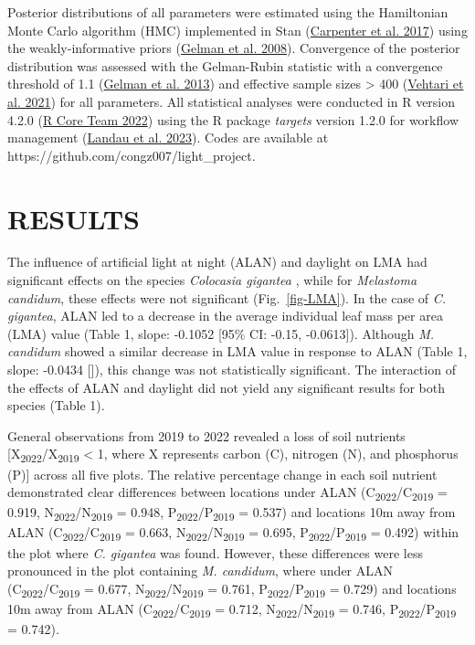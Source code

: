 \documentclass[
  12pt,
  letterpaper,
  DIV=11,
  numbers=noendperiod]{scrartcl}
\providecommand{\DIFaddtex}[1]{{\protect\color{blue}\uwave{#1}}} %
\providecommand{\DIFaddbegin}{} %
\providecommand{\DIFaddend}{} %
\providecommand{\DIFadd}[1]{\texorpdfstring{\DIFaddtex{#1}}{#1}} %
\newcommand{\DIFaddincludegraphics}[2][]{{\color{blue}\fbox{\DIFOincludegraphics[#1]{#2}}}} %
\DeclareRobustCommand{\DIFaddbegin}{\DIFOaddbegin \let\includegraphics\DIFaddincludegraphics} %
\DeclareRobustCommand{\DIFaddend}{\DIFOaddend \let\includegraphics\DIFOincludegraphics} %
\begin{document}
Posterior distributions of all parameters were estimated using the
Hamiltonian Monte Carlo algorithm (HMC) implemented in Stan
(\protect\hyperlink{ref-Carpenter2017}{Carpenter et al. 2017}) using the
weakly-informative priors (\protect\hyperlink{ref-Gelman2008}{Gelman et
al. 2008}). Convergence of the posterior distribution was assessed with
the Gelman-Rubin statistic with a convergence threshold of 1.1
(\protect\hyperlink{ref-Gelman2013}{Gelman et al. 2013}) and effective
sample sizes \textgreater{} 400
(\protect\hyperlink{ref-Vehtari2021}{Vehtari et al. 2021}) for all
parameters. All statistical analyses were conducted in R version 4.2.0
(\protect\hyperlink{ref-RCoreTeam2022}{R Core Team 2022}) using the R
package \emph{targets} version 1.2.0 for workflow management
(\protect\hyperlink{ref-Landau2023}{Landau et al. 2023}). Codes are
available at https://github.com/congz007/light\_project.

\hypertarget{results}{%
\section{RESULTS}\label{results}}

The influence of artificial light at night (ALAN) and daylight on LMA
had significant effects on the species \emph{Colocasia gigantea }, while
for \emph{Melastoma candidum}, these effects were not significant
(Fig.~\ref{fig-LMA}). In the case of \emph{C. gigantea}, ALAN led to a
decrease in the average individual leaf mass per area (LMA) value (Table
1, slope: -0.1052 {[}95\% CI: -0.15, -0.0613{]}). Although \emph{M.
candidum} showed a similar decrease in LMA value in response to ALAN
(Table 1, slope: -0.0434 \DIFaddbegin {[}\DIFadd{95\% CI: -0.1147, 0.0278}{]}\DIFaddend ), this change
was not statistically significant. The interaction of the effects of
ALAN and daylight did not yield any significant results for both species
(Table 1).

General observations from 2019 to 2022 revealed a loss of soil nutrients
{[}X\textsubscript{2022}/X\textsubscript{2019} \textless{} 1, where X
represents carbon (C), nitrogen (N), and phosphorus (P){]} across all
five plots. The relative percentage change in each soil nutrient
demonstrated clear differences between locations under ALAN
(C\textsubscript{2022}/C\textsubscript{2019} = 0.919,
N\textsubscript{2022}/N\textsubscript{2019} = 0.948,
P\textsubscript{2022}/P\textsubscript{2019} = 0.537) and locations 10m
away from ALAN (C\textsubscript{2022}/C\textsubscript{2019} = 0.663,
N\textsubscript{2022}/N\textsubscript{2019} = 0.695,
P\textsubscript{2022}/P\textsubscript{2019} = 0.492) within the plot
where \emph{C. gigantea} was found. However, these differences were less
pronounced in the plot containing \emph{M. candidum}, where under ALAN
(C\textsubscript{2022}/C\textsubscript{2019} = 0.677,
N\textsubscript{2022}/N\textsubscript{2019} = 0.761,
P\textsubscript{2022}/P\textsubscript{2019} = 0.729) and locations 10m
away from ALAN (C\textsubscript{2022}/C\textsubscript{2019} = 0.712,
N\textsubscript{2022}/N\textsubscript{2019} = 0.746,
P\textsubscript{2022}/P\textsubscript{2019} = 0.742).
\end{document}
